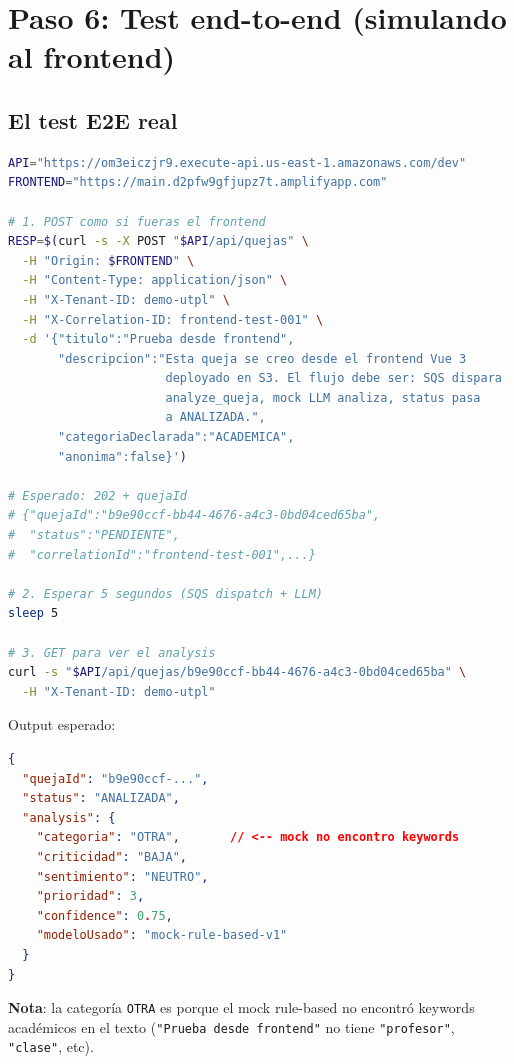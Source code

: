 \documentclass[11pt,a4paper,oneside]{article}
\begin{document}
\section{Paso 6: Test end-to-end (simulando al frontend)}

\subsection{El test E2E real}

\begin{lstlisting}[language=bash,caption={Test E2E: frontend simulado}]
API="https://om3eiczjr9.execute-api.us-east-1.amazonaws.com/dev"
FRONTEND="https://main.d2pfw9gfjupz7t.amplifyapp.com"

# 1. POST como si fueras el frontend
RESP=$(curl -s -X POST "$API/api/quejas" \
  -H "Origin: $FRONTEND" \
  -H "Content-Type: application/json" \
  -H "X-Tenant-ID: demo-utpl" \
  -H "X-Correlation-ID: frontend-test-001" \
  -d '{"titulo":"Prueba desde frontend",
       "descripcion":"Esta queja se creo desde el frontend Vue 3
                      deployado en S3. El flujo debe ser: SQS dispara
                      analyze_queja, mock LLM analiza, status pasa
                      a ANALIZADA.",
       "categoriaDeclarada":"ACADEMICA",
       "anonima":false}')

# Esperado: 202 + quejaId
# {"quejaId":"b9e90ccf-bb44-4676-a4c3-0bd04ced65ba",
#  "status":"PENDIENTE",
#  "correlationId":"frontend-test-001",...}

# 2. Esperar 5 segundos (SQS dispatch + LLM)
sleep 5

# 3. GET para ver el analysis
curl -s "$API/api/quejas/b9e90ccf-bb44-4676-a4c3-0bd04ced65ba" \
  -H "X-Tenant-ID: demo-utpl"
\end{lstlisting}

Output esperado:
\begin{lstlisting}[language=json]
{
  "quejaId": "b9e90ccf-...",
  "status": "ANALIZADA",
  "analysis": {
    "categoria": "OTRA",       // <-- mock no encontro keywords
    "criticidad": "BAJA",
    "sentimiento": "NEUTRO",
    "prioridad": 3,
    "confidence": 0.75,
    "modeloUsado": "mock-rule-based-v1"
  }
}
\end{lstlisting}

\textbf{Nota}: la categor\'ia \texttt{OTRA} es porque el mock rule-based no encontr\'o keywords acad\'emicos en el texto (\texttt{"Prueba desde frontend"} no tiene \texttt{"profesor"}, \texttt{"clase"}, etc).
\end{document}
